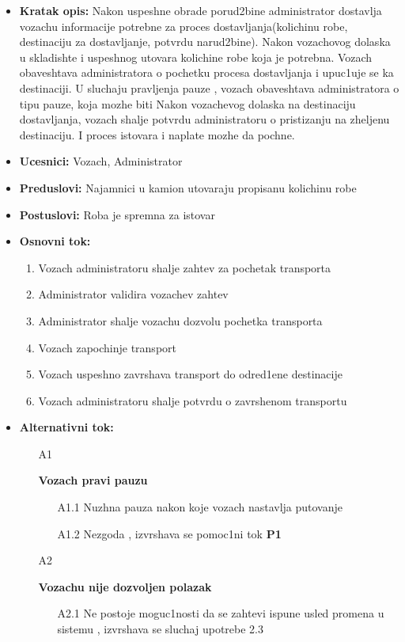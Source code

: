  \begin{itemize}
		\item {\textbf{Kratak opis:} Nakon uspeshne obrade porud2bine administrator dostavlja vozachu informacije potrebne za proces 			dostavljanja(kolichinu robe, destinaciju za dostavljanje, potvrdu narud2bine). Nakon vozachovog dolaska u skladishte i uspeshnog utovara kolichine robe koja je potrebna. Vozach obaveshtava administratora o pochetku procesa dostavljanja i upuc1uje se ka destinaciji. U sluchaju pravljenja pauze , vozach obaveshtava administratora o tipu pauze, koja mozhe biti Nakon vozachevog dolaska na destinaciju dostavljanja, vozach shalje potvrdu administratoru o pristizanju na zheljenu destinaciju. I proces istovara i naplate mozhe da pochne.}
		\item{\textbf{Ucesnici:} Vozach, Administrator}
		\item{\textbf{Preduslovi:}  Najamnici u kamion utovaraju propisanu  kolichinu robe }
		\item{\textbf{Postuslovi:}  Roba je spremna za istovar}
		\item{\textbf{Osnovni tok:}  
			\begin{enumerate}
				\item{Vozach administratoru shalje zahtev za pochetak transporta}
				\item{Administrator validira vozachev zahtev}
				\item{Administrator shalje vozachu dozvolu pochetka transporta}
				\item{Vozach zapochinje transport }
				\item{Vozach uspeshno zavrshava transport do odred1ene destinacije}
				\item {Vozach administratoru shalje potvrdu o zavrshenom transportu}
		\end{enumerate}}
	\item{\textbf{Alternativni tok:} 
		 \begin{itemize}
			\item[A{1}]{\textbf{Vozach pravi pauzu}
				 \begin{itemize}
					\item[A{1.1}] {Nuzhna pauza nakon koje vozach nastavlja putovanje}
					\item[A{1.2}] {Nezgoda , izvrshava se pomoc1ni tok  \textbf{P{1}}}
				\end{itemize}
								} 
			\item[A{2}] {\textbf{Vozachu nije dozvoljen polazak} 
				\begin{itemize}
					\item[A{2.1}]{Ne postoje moguc1nosti da se zahtevi ispune usled promena u sistemu , izvrshava se sluchaj upotrebe 2.3}
				\end{itemize}		
		
}
\end{itemize}}
\end{itemize}
